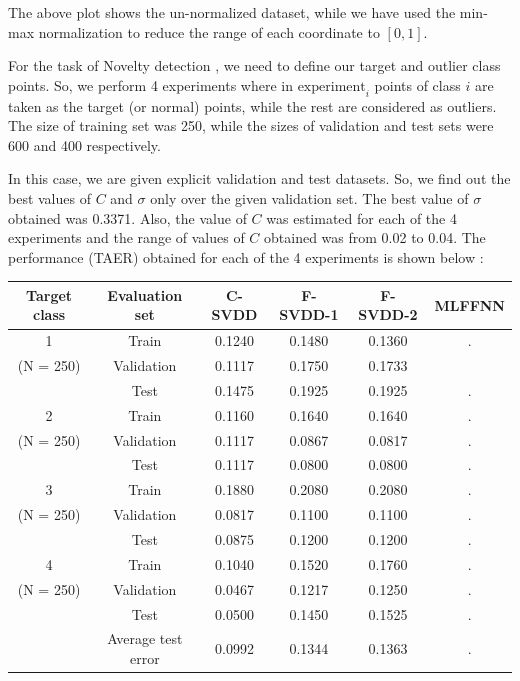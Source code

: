 \documentclass{article} %
\begin{document}
The above plot shows the un-normalized dataset, while we have used the min-max normalization to reduce the  range of each coordinate to $[0,1]$. 

For the task of Novelty detection , we need to define our target and outlier class points. So, we perform 4 experiments where in $\text{experiment}_{i}$ points of class $i$ are taken as the target (or normal) points, while the rest are considered as outliers. The size of training set was 250, while the sizes of validation and test sets were 600 and 400 respectively.

In this case, we are given explicit validation and test datasets. So, we find out the best values of $C$ and $\sigma$ only over the given validation set. The best value of $\sigma$ obtained was 0.3371. Also, the value of $C$ was estimated for each of the 4 experiments and the range of values of $C$ obtained was from 0.02 to 0.04.
The performance (TAER) obtained for each of the 4 experiments is shown below : \\[5pt]
\begin{center}
\begin{tabular}{|c|c|c|c|c|c|}
\hline
Target class & Evaluation set & C-SVDD & F-SVDD-1 & F-SVDD-2 & MLFFNN \\ \hline
 1 & Train & 0.1240 & 0.1480 & 0.1360 & . \\ 
 (N = 250) & Validation & 0.1117 & 0.1750 & 0.1733 &  \\ 
 & Test &  0.1475 & 0.1925 &  0.1925 & . \\ \hline
 
 2 & Train & 0.1160 & 0.1640 & 0.1640 & . \\ 
  (N = 250)& Validation &  0.1117  &  0.0867 &  0.0817 & . \\ 
 & Test &  0.1117  &  0.0800 & 0.0800  & . \\ \hline
 
 
 3 & Train & 0.1880 & 0.2080  & 0.2080 & . \\ 
 (N = 250) & Validation & 0.0817 & 0.1100 &  0.1100 & . \\ 
 & Test &  0.0875 &  0.1200 & 0.1200  & . \\ \hline
 
 
 4 & Train & 0.1040 & 0.1520 &  0.1760 & . \\ 
 (N = 250) & Validation &  0.0467 & 0.1217 & 0.1250 & . \\ 
 & Test & 0.0500 &  0.1450 &  0.1525 & . \\ \hline
 
& Average test error  &  0.0992 &  0.1344 & 0.1363 &. \\ \hline

\end{tabular} \\[10pt]
\end{center}
\end{document}
